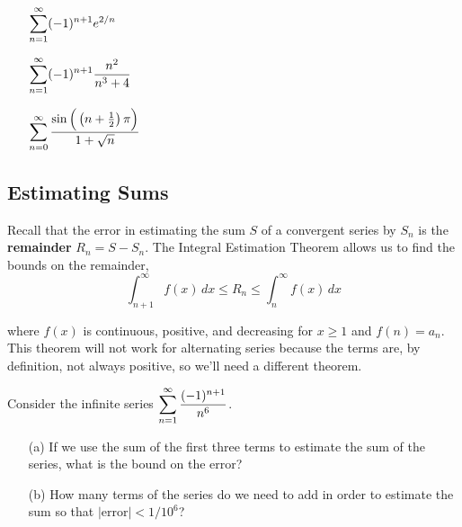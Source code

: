 \documentclass[12pt]{article}
\begin{document}
\ExamplesCont

\begin{itemize}
\item[\tc{2}] $\displaystyle\sum_{n=1}^\infty(-1)^{n+1}e^{2/n}$

\vfill

\item[\tc{3}] $\displaystyle\sum_{n=1}^\infty (-1)^{n+1}\dfrac{n^2}{n^3+4}$

\vfill

\end{itemize}

\newpage

\ExamplesCont

\begin{itemize}
\item[\tc{4}] $\displaystyle\sum_{n=0}^\infty \dfrac{\sin\Big(\left(n+\frac{1}{2}\right)\pi\Big)}{1+\sqrt{n}}$
\end{itemize}

\vfill

\subsection*{Estimating Sums}

Recall that the error in estimating the sum $S$ of a convergent series by $S_n$ is the \textbf{remainder} $R_n=S-S_n$. The Integral Estimation Theorem allows us to find the bounds on the remainder,
$$\int_{n+1}^\infty f(x)\,dx\leq R_n\leq \int_n^\infty f(x)\,dx$$

where $f(x)$ is continuous, positive, and decreasing for $x\geq 1$ and $f(n)=a_n$. This theorem will not work for alternating series because the terms are, by definition, not always positive, so we'll need a different theorem.

\vspace{4mm}


\vspace{30mm}

\newpage

\Example Consider the infinite series $\displaystyle\sum_{n=1}^\infty\dfrac{(-1)^{n+1}}{n^6}$.

\begin{enumerate}
\item[(a)] If we use the sum of the first three terms to estimate the sum of the series, what is the bound on the error?

\vfill

\item[(b)] How many terms of the series do we need to add in order to estimate the sum so that $\big|$error$\big|<1/10^6$?

\vfill
\end{enumerate}
\end{document}
